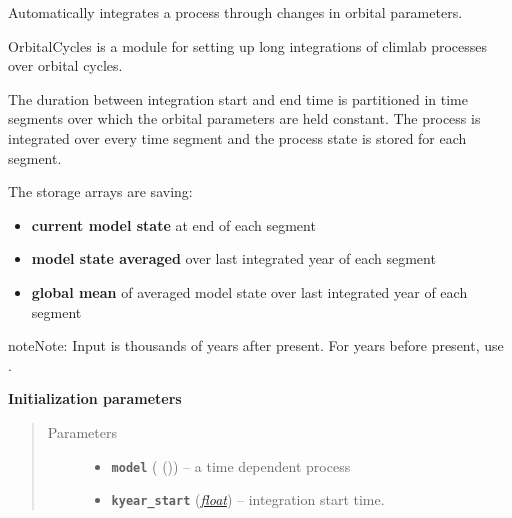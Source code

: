 \documentclass[a4paper,10pt,english]{sphinxmanual}
\begin{document}
\begin{fulllineitems}
\label{api/climlab.solar:climlab.solar.orbital_cycles.OrbitalCycles}
Automatically integrates a process through changes in orbital parameters.

OrbitalCycles is a module for setting up long integrations of climlab 
processes over orbital cycles.

The duration between integration start and end time is partitioned in 
time segments over which the orbital parameters are held constant.
The process is integrated over every time segment and the process state
 is stored for each segment.

The storage arrays are saving:
\begin{itemize}
\item {} 
\textbf{current model state} at end of each segment

\item {} 
\textbf{model state averaged} over last integrated year of each segment

\item {} 
\textbf{global mean} of averaged model state over last integrated year 
of each segment

\end{itemize}

\begin{notice}{note}{Note:}
Input  is thousands of years after present.
For years before present, use .
\end{notice}

\textbf{Initialization parameters}
\begin{quote}\begin{description}
\item[{Parameters}] \leavevmode\begin{itemize}
\item {} 
\textbf{\texttt{model}} ({\hyperref[api/climlab.process:climlab.process.time_dependent_process.TimeDependentProcess]{\emph{}}} ()) -- a time dependent process

\item {} 
\textbf{\texttt{kyear\_start}} (\href{http://docs.python.org/2.7/library/functions.html\#float}{\emph{float}}) -- 
integration start time.


\end{itemize}
\end{description}
\end{quote}
\end{fulllineitems}
\end{document}
